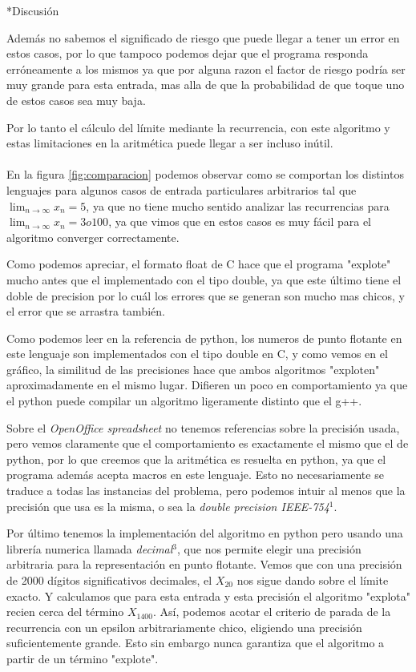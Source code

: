 \documentclass[12pt,titlepage]{article}
\newenvironment{usection}[1]{\newpage\begin{section}*{#1}	\addcontentsline{toc}{section}{#1}}{\end{section}}
\begin{document}
\begin{usection}{Discusión}
		Además no sabemos el significado de riesgo que puede llegar a tener
		un error en estos casos, por lo que tampoco podemos dejar que
		el programa responda erróneamente a los mismos ya que
		por alguna razon el factor de riesgo podría ser muy grande para esta entrada,
		mas alla de que la probabilidad de que toque uno de estos casos sea muy baja.

		Por lo tanto el cálculo del límite mediante la recurrencia,
		con este algoritmo y estas limitaciones en la aritmética puede llegar a ser incluso inútil. \\
\\
		En la figura \ref{fig:comparacion} podemos observar como se comportan
		los distintos lenguajes para algunos casos de entrada
		particulares arbitrarios tal que $\lim_{n\to\infty} x_n = 5$,
		ya que no tiene mucho sentido analizar las recurrencias
		para $\lim_{n\to\infty} x_n = 3 o 100$,
		ya que vimos que en estos casos es muy fácil para el algoritmo
		converger correctamente.

		Como podemos apreciar, el formato float de C hace
		que el programa "explote" mucho antes que el implementado
		con el tipo double, ya que este último tiene el doble de precision
		por lo cuál los errores que se generan son mucho mas chicos,
		y el error que se arrastra también.

		Como podemos leer en la referencia de python,
		los numeros de punto flotante en este lenguaje
		son implementados con el tipo double en C, y como vemos en el gráfico,
		la similitud de las precisiones hace que ambos algoritmos
		"exploten" aproximadamente en el mismo lugar.
		Difieren un poco en comportamiento ya que el python
		puede compilar un algoritmo ligeramente distinto que el g++.

		Sobre el \textit{OpenOffice spreadsheet} no tenemos referencias sobre la precisión usada,
		pero vemos claramente que el comportamiento es exactamente el mismo que el de python,
		por lo que creemos que la aritmética es resuelta en python,
		ya que el programa además acepta macros en este lenguaje.
		Esto no necesariamente se traduce a todas las instancias del problema,
		pero podemos intuir al menos que la precisión que usa es la misma,
		o sea la \textit{double precision IEEE-754}$^1$.

		Por último tenemos la implementación del algoritmo en python
		pero usando una librería numerica llamada \textit{decimal}$^3$,
		que nos permite elegir una precisión arbitraria para
		la representación en punto flotante.
		Vemos que con una precisión de 2000 dígitos significativos decimales,
		el $X_20$ nos sigue dando sobre el límite exacto.
		Y calculamos que para esta entrada y esta precisión
		el algoritmo "explota" recien cerca del término $X_1400$.
		Así, podemos acotar el criterio de parada de la recurrencia
		con un epsilon arbitrariamente chico, eligiendo una precisión
		suficientemente grande. Esto sin embargo nunca garantiza
		que el algoritmo a partir de un término "explote".

	\end{usection}
	
\end{document}
